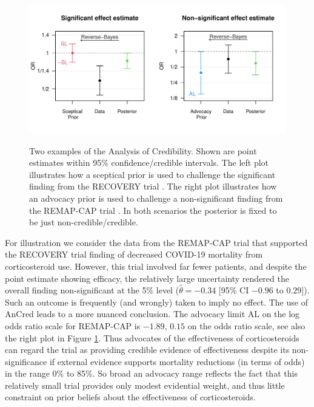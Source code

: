 \begin{figure}[!htb]
\begin{knitrout}
\color{fgcolor}
{\centering \includegraphics[width=\maxwidth]{images/paper4/AnCred-examples-plot-1}
}
\end{knitrout}
\caption{Two examples of the Analysis of Credibility. Shown are point estimates
  within 95\% confidence/credible intervals. The left plot illustrates how a
  sceptical prior is used to challenge the significant finding from the RECOVERY
  trial \citep{RECOVERY2020}. The right plot illustrates how an advocacy prior
  is used to challenge a non-significant finding from the REMAP-CAP trial
  \citep{REMAPCAP2020}. In both scenarios the posterior is fixed to be just
  non-credible/credible.}
\label{fig4:anCredEx}
\end{figure}

For illustration we consider the data from the REMAP-CAP trial that supported
the RECOVERY trial finding of decreased COVID-19 mortality from corticosteroid
use. However, this trial involved far fewer patients, and despite the point
estimate showing efficacy, the relatively large uncertainty rendered the overall
finding non-significant at the 5\% level ($\hat{\theta} = -0.34$ [95\% CI
$-0.96$ to $0.29$]). Such an outcome is frequently (and wrongly) taken to imply
no effect. The use of AnCred leads to a more nuanced conclusion. The advocacy
limit AL on the log odds ratio scale for REMAP-CAP is $-1.89$, \ie $0.15$ on the
odds ratio scale, see also the right plot in Figure \ref{fig4:anCredEx}. Thus
advocates of the effectiveness of corticosteroids can regard the trial as
providing credible evidence of effectiveness despite its non-significance if
external evidence supports mortality reductions (in terms of odds) in the range
0\% to 85\%. So broad an advocacy range reflects the fact that this relatively
small trial provides only modest evidential weight, and thus little constraint
on prior beliefs about the effectiveness of corticosteroids.

